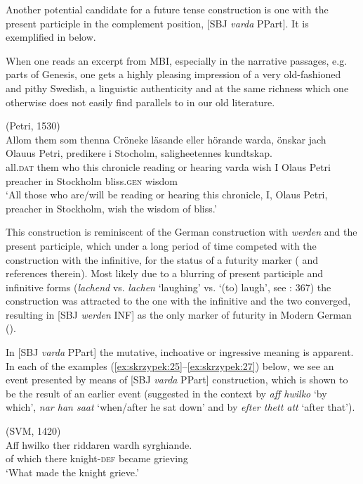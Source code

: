 \documentclass[output=paper,colorlinks,citecolor=brown]{langscibook}
\begin{document}
Another potential candidate for a future tense construction is one with the present participle in the complement position, [SBJ \textit{varda} PPart]. It is exemplified in  below.

When one reads an excerpt from MBI, especially in the narrative passages, e.g. parts of Genesis, one gets a highly pleasing impression of a very old-fashioned and pithy Swedish, a linguistic authenticity and at the same richness which one otherwise does not easily find parallels to in our old literature. 

\ea \label{ex:skrzypek:24}
    (Petri, 1530)\\
    \gll Allom them som thenna Cröneke läsande eller hörande warda, önskar jach Olauus Petri, predikere i Stocholm, saligheetennes kundtskap.\\
    all.\textsc{dat} them who this chronicle reading or hearing varda wish I Olaus Petri preacher in Stockholm bliss.\textsc{gen} wisdom\\
    \glt ‘All those who are/will be reading or hearing this chronicle, I, Olaus Petri, preacher in Stockholm, wish the wisdom of bliss.’
\z

This construction is reminiscent of the German construction with \textit{werden} and the present participle, which under a long period of time competed with the construction with the infinitive, for the status of a futurity marker (\citet{Hartmann2021} and references therein). Most likely due to a blurring of present participle and infinitive forms (\textit{lachend} vs. \textit{lachen }‘laughing’ vs. ‘(to) laugh’, see \cite{Hartmann2021}: 367) the construction was attracted to the one with the infinitive and the two converged, resulting in [SBJ \textit{werden} INF] as the only marker of futurity in Modern German (\cite{Hartmann2021}). 

In [SBJ \textit{varda} PPart] the mutative, inchoative or ingressive meaning is apparent. In each of the examples (\ref{ex:skrzypek:25}--\ref{ex:skrzypek:27}) below, we see an event presented by means of [SBJ \textit{varda} PPart] construction, which is shown to be the result of an earlier event (suggested in the context by \textit{aff hwilko} ‘by which’, \textit{nar han saat} ‘when/after he sat down’ and by \textit{efter thett att} ‘after that’). 

\ea \label{ex:skrzypek:25}
    (SVM, 1420)\\
    \gll Aff hwilko ther riddaren wardh syrghiande.\\
    of which there knight-\textsc{def} became grieving\\
    \glt ‘What made the knight grieve.’
\z
\end{document}
